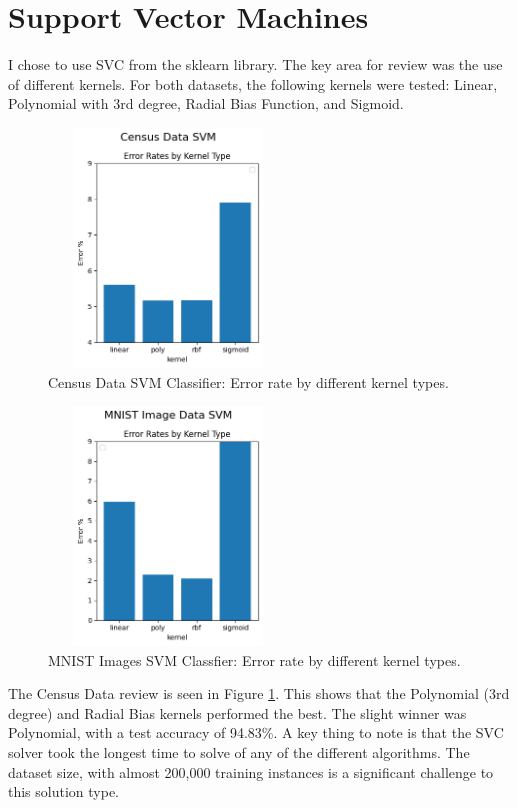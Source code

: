 \documentclass[letterpaper]{article} %
\begin{document}
\section{Support Vector Machines}

I chose to use SVC from the sklearn library.  The key area for review was the use of different kernels.  For both datasets, the following kernels were tested: Linear, Polynomial with 3rd degree, Radial Bias Function, and Sigmoid.

\begin{figure}[h]
\centering
\includegraphics[width=2.5in, height=2.5in]{figures/Census_Data_SVM_svm_1.png}
\caption{Census Data SVM Classifier:  Error rate by different kernel types.  }
\label{fig:svm_census_1}
\end{figure}

\begin{figure}[h]
\centering
\includegraphics[width=2.5in, height=2.5in]{figures/MNIST_Image_Data_SVM_svm_1.png}
\caption{MNIST Images SVM Classfier:  Error rate by different kernel types.  }
\label{fig:svm_mnist_1}
\end{figure}

The Census Data review is seen in Figure \ref{fig:svm_census_1}.  This shows that the Polynomial (3rd degree) and Radial Bias kernels performed the best.  The slight winner was Polynomial, with a test accuracy of  94.83\%.  A key thing to note is that the SVC solver took the longest time to solve of any of the different algorithms.  The dataset size, with almost 200,000 training instances is a significant challenge to this solution type.
\end{document}
